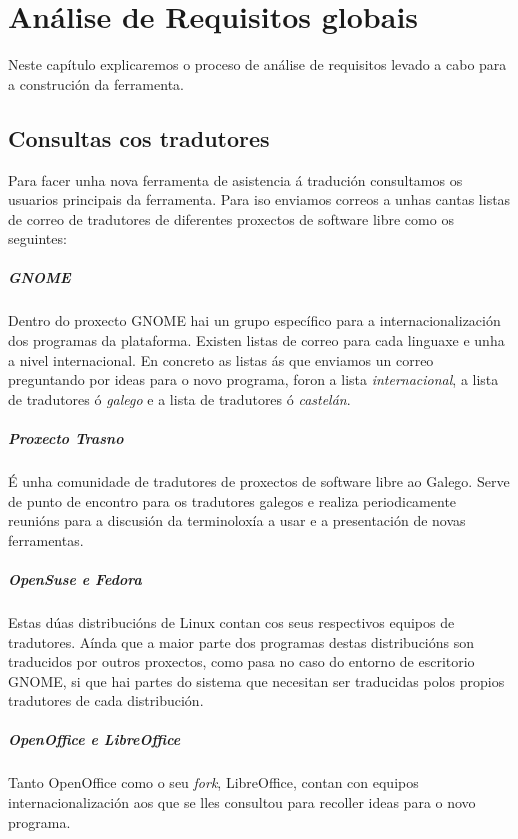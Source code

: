 \chapter[Análise de Requisitos]{Análise de Requisitos globais}

Neste capítulo explicaremos o proceso de análise de requisitos levado a cabo para a construción da ferramenta.

\section{Consultas cos tradutores}
Para facer unha nova ferramenta de asistencia á tradución consultamos os usuarios principais da ferramenta. Para iso enviamos correos a unhas cantas listas de correo de tradutores de diferentes proxectos de software libre como os seguintes:

\paragraph{GNOME} Dentro do proxecto GNOME hai un grupo específico para a internacionalización dos programas da plataforma. Existen listas de correo para cada linguaxe e unha a nivel internacional. En concreto as listas ás que enviamos un correo preguntando por ideas para o novo programa, foron a lista \emph{internacional}, a lista de tradutores ó \emph{galego} e a lista de tradutores ó \emph{castelán}.

\paragraph{Proxecto Trasno} É unha comunidade de tradutores de proxectos de software libre ao Galego. Serve de punto de encontro para os tradutores galegos e realiza periodicamente reunións para a discusión da terminoloxía a usar e a presentación de novas ferramentas.

\paragraph{OpenSuse e Fedora} Estas dúas distribucións de Linux contan cos seus respectivos equipos de tradutores. Aínda que a maior parte dos programas destas distribucións son traducidos por outros proxectos, como pasa no caso do entorno de escritorio GNOME, si que hai partes do sistema que necesitan ser traducidas polos propios tradutores de cada distribución.

\paragraph{OpenOffice e LibreOffice} Tanto OpenOffice como o seu \emph{fork}, LibreOffice, contan con equipos internacionalización aos que se lles consultou para recoller ideas para o novo programa.

